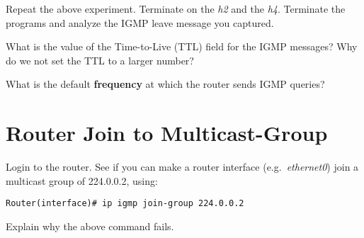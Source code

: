 \documentclass{../UTNetLab}
\begin{document}
Repeat the above experiment.
Terminate  on the \textit{h2} and the \textit{h4}.
Terminate the  programs and analyze the IGMP leave message you captured.

\begin{report}
    \item What is the value of the Time-to-Live (TTL) field for the IGMP messages?
    Why do we not set the TTL to a larger number?

    \item What is the default \textbf{frequency} at which the router sends IGMP queries?
\end{report}

\section{Router Join to Multicast-Group}
Login to the router.
See if you can make a router interface (e.g.\ \textit{ethernet0}) join a multicast group of 224.0.0.2, using:
\begin{lstlisting}[language={cisco}]
Router(interface)# ip igmp join-group 224.0.0.2
    \end{lstlisting}

\begin{report}
    \item Explain why the above command fails.
\end{report}
\end{document}
